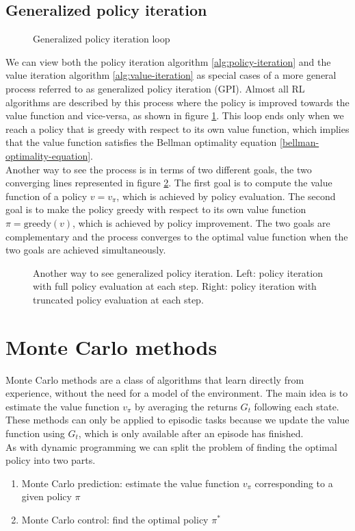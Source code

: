 \subsection{Generalized policy iteration}
\begin{figure}
    \centering
    
    \caption{Generalized policy iteration loop}
    \label{fig:gpi}
\end{figure} 
We can view both the policy iteration algorithm \ref{alg:policy-iteration} and the value iteration algorithm \ref{alg:value-iteration} as special cases of a more general process referred to as generalized policy iteration (GPI). Almost all RL algorithms are described by this process where the policy is improved towards the value function and vice-versa, as shown in figure \ref{fig:gpi}. This loop ends only when we reach a policy that is greedy with respect to its own value function, which implies that the value function satisfies the Bellman optimality equation \eqref{bellman-optimality-equation}.\\
Another way to see the process is in terms of two different goals, the two converging lines represented in figure \ref{fig:gpi2}. The first goal is to compute the value function of a policy $v=v_{\pi}$, which is achieved by policy evaluation. The second goal is to make the policy greedy with respect to its own value function $\pi=\mathrm{greedy}(v)$, which is achieved by policy improvement. The two goals are complementary and the process converges to the optimal value function when the two goals are achieved simultaneously.
\begin{figure}[H]
    \centering
    
    \caption{Another way to see generalized policy iteration. Left: policy iteration with full policy evaluation at each step. Right: policy iteration with truncated policy evaluation at each step.}
    \label{fig:gpi2}
\end{figure}

\section{Monte Carlo methods}
Monte Carlo methods are a class of algorithms that learn directly from experience, without the need for a model of the environment. The main idea is to estimate the value function $v_{\pi}$ by averaging the returns $G_t$ following each state. These methods can only be applied to episodic tasks because we update the value function using $G_t$, which is only available after an episode has finished.\\
As with dynamic programming we can split the problem of finding the optimal policy into two parts.
\begin{enumerate}
    \item Monte Carlo prediction: estimate the value function $v_{\pi}$ corresponding to a given policy $\pi$
    \item Monte Carlo control: find the optimal policy $\pi^*$
\end{enumerate}

